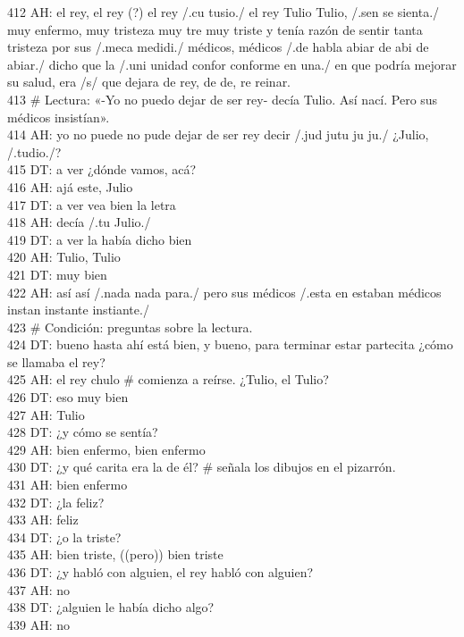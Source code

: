 412 AH: el rey, el rey (?) el rey /.cu tusio./ el rey Tulio Tulio, /.sen se sienta./ muy enfermo, muy tristeza muy tre muy triste y tenía razón de sentir tanta tristeza por sus /.meca medidi./ médicos, médicos /.de habla abiar de abi de abiar./ dicho que la /.uni unidad confor conforme en una./ en que podría mejorar su salud, era /s/ que dejara de rey, de de, re reinar.\\
413 \# Lectura: «-Yo no puedo dejar de ser rey- decía Tulio. Así nací. Pero sus médicos insistían».\\
414 AH: yo no puede no pude dejar de ser rey decir /.jud jutu ju ju./ ¿Julio, /.tudio./?\\
415 DT: a ver ¿dónde vamos, acá?\\
416 AH: ajá este, Julio\\
417 DT: a ver vea bien la letra\\
418 AH: decía /.tu Julio./\\
419 DT: a ver la había dicho bien\\
420 AH: Tulio, Tulio\\
421 DT: muy bien\\
422 AH: así así /.nada nada para./ pero sus médicos /.esta en estaban médicos instan instante instiante./\\
423 \# Condición: preguntas sobre la lectura.\\
424 DT: bueno hasta ahí está bien, y bueno, para terminar estar partecita ¿cómo se llamaba el rey?\\
425 AH: el rey chulo \# comienza a reírse. ¿Tulio, el Tulio?\\
426 DT: eso muy bien\\
427 AH: Tulio\\
428 DT: ¿y cómo se sentía?\\
429 AH: bien enfermo, bien enfermo\\
430 DT: ¿y qué carita era la de él? \# señala los dibujos en el pizarrón.\\
431 AH: bien enfermo\\
432 DT: ¿la feliz?\\
433 AH: feliz\\
434 DT: ¿o la triste?\\
435 AH: bien triste, ((pero)) bien triste\\
436 DT: ¿y habló con alguien, el rey habló con alguien?\\
437 AH: no\\
438 DT: ¿alguien le había dicho algo?\\
439 AH: no\\
